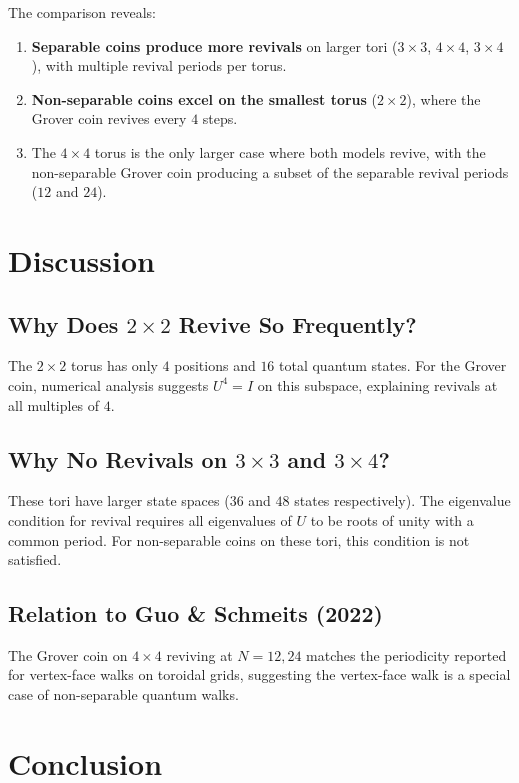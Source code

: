 \documentclass[12pt]{article}
\begin{document}
The comparison reveals:

\begin{enumerate}
    \item \textbf{Separable coins produce more revivals} on larger tori ($3 \times 3$, $4 \times 4$, $3 \times 4$), with multiple revival periods per torus.
    \item \textbf{Non-separable coins excel on the smallest torus} ($2 \times 2$), where the Grover coin revives every $4$ steps.
    \item The $4 \times 4$ torus is the only larger case where both models revive, with the non-separable Grover coin producing a subset of the separable revival periods ($12$ and $24$).
\end{enumerate}

\section{Discussion}

\subsection{Why Does $2 \times 2$ Revive So Frequently?}

The $2 \times 2$ torus has only $4$ positions and $16$ total quantum states. For the Grover coin, numerical analysis suggests $U^4 = I$ on this subspace, explaining revivals at all multiples of $4$.

\subsection{Why No Revivals on $3 \times 3$ and $3 \times 4$?}

These tori have larger state spaces ($36$ and $48$ states respectively). The eigenvalue condition for revival requires all eigenvalues of $U$ to be roots of unity with a common period. For non-separable coins on these tori, this condition is not satisfied.

\subsection{Relation to Guo \& Schmeits (2022)}

The Grover coin on $4 \times 4$ reviving at $N = 12, 24$ matches the periodicity reported for vertex-face walks on toroidal grids, suggesting the vertex-face walk is a special case of non-separable quantum walks.

\section{Conclusion}
\end{document}
